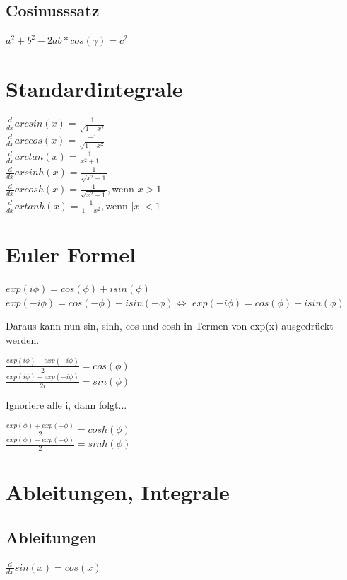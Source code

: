 \subsection{Cosinusssatz}
$a^2 + b^2 -2ab*cos(\gamma)= c^2$


\section{Standardintegrale}
$\frac{d}{dx} arcsin(x) = \frac{1}{\sqrt{1-x^2}}$ \\

$\frac{d}{dx} arccos(x) = \frac{-1}{\sqrt{1-x^2}}$ \\

$\frac{d}{dx} arctan(x) =\frac {1}{x^2+1}$\\

$\frac{d}{dx} arsinh(x) =\frac{1}{\sqrt{x^2+1}}$\\

$\frac{d}{dx} arcosh(x) =\frac{1}{\sqrt{x^2-1}}, $wenn $ x>1$\\

$\frac{d}{dx} artanh(x) =\frac{1}{1-x^2}, $wenn $ |x|<1$\\


\section{Euler Formel}
$exp(i \phi) = cos(\phi) + isin(\phi)$
\\
$exp(-i \phi) = cos(-\phi) + isin(-\phi) \Longleftrightarrow $ 
$exp(-i \phi) = cos(\phi) - isin(\phi)$ 

Daraus kann nun sin, sinh, cos und cosh in Termen von exp(x) ausgedrückt werden.

$\frac{exp(i \phi) + exp(-i \phi)}{2}  = cos(\phi)$\\
$\frac{exp(i \phi) - exp(-i \phi)}{2i}  = sin(\phi)$

Ignoriere alle i, dann folgt...

$\frac{exp(\phi) + exp(-\phi)}{2}  = cosh(\phi)$\\
$\frac{exp(\phi) - exp(-\phi)}{2}  = sinh(\phi)$




\section{Ableitungen, Integrale}
\subsection{Ableitungen}
$\frac{d}{dx}sin(x) = cos(x)$

